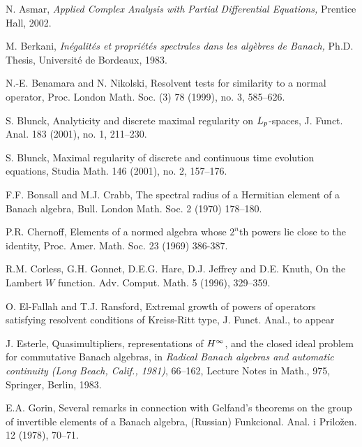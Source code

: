\documentclass[12pt]{amsart}
\begin{document}
\begin{thebibliography}{999}

N. Asmar, {\it Applied Complex Analysis with Partial Differential
Equations,} Prentice Hall, 2002.

M. Berkani,
{\it In\'egalit\'es et propri\'et\'es spectrales dans les alg\`ebres
de Banach,}  Ph.D. Thesis, Universit\'e de Bordeaux, 1983.

N.-E. Benamara and N. Nikolski,
Resolvent tests for similarity to a normal operator,
Proc. London Math. Soc. (3) 78 (1999), no. 3, 585--626.

S. Blunck,
Analyticity and discrete maximal regularity on $L\sb p$-spaces,
J. Funct. Anal.  183  (2001),  no. 1, 211--230.

S. Blunck,
Maximal regularity of discrete and continuous time evolution equations,
Studia Math.  146  (2001),  no. 2, 157--176.

F.F. Bonsall and M.J. Crabb,  The spectral radius of a Hermitian
element of a Banach algebra, Bull. London Math. Soc. 2 (1970)
178--180.

 P.R. Chernoff, Elements of a normed algebra
whose $2^n$th powers lie close to the identity, Proc. Amer. Math.
Soc. 23 (1969) 386-387.

R.M. Corless, G.H. Gonnet, D.E.G. Hare, D.J. Jeffrey and D.E.
Knuth,  On the Lambert $W$ function. Adv. Comput. Math. 5 (1996),
 329--359.

O. El-Fallah and T.J. Ransford,
Extremal growth of powers of operators satisfying resolvent
conditions of Kreiss-Ritt type, J. Funct. Anal., to appear

J. Esterle,  Quasimultipliers, representations of $H\sp{\infty }$,
and the closed ideal problem for commutative Banach algebras, in
{\it Radical Banach algebras and automatic continuity (Long Beach,
Calif., 1981)}, 66--162, Lecture Notes in Math., 975, Springer,
Berlin, 1983.


 E.A. Gorin,  Several remarks in connection with Gelfand's theorems on the group
   of invertible elements of a Banach algebra, (Russian) Funkcional. Anal. i Prilo\v zen. 12 (1978),
   70--71.









\end{thebibliography}
\end{document}
